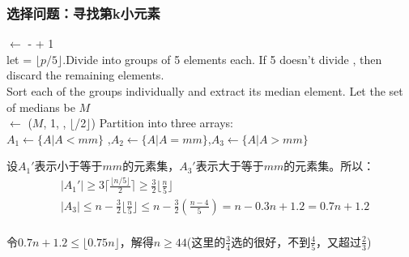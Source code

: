 \documentclass[./../main.tex]{subfiles}
\begin{document}
\subsubsection{选择问题：寻找第k小元素}
\begin{algorithm}[!t]


    \BlankLine
    \p $\leftarrow$ \high - \low + 1\\
    let \q = $\lfloor p/5 \rfloor$.Divide \A into \q groups of 5 elements each. If 5 doesn't divide \p, then discard the remaining elements.\\
    Sort each of the \q groups individually and extract its median element. Let the set of medians be $M$ \\ 
    \mm $\leftarrow$ \Select($M$, 1, \q, $\lfloor$\q/2$\rfloor$) 
    Partition \A into three arrays:\\
    $A_1\leftarrow \{A|A<mm\}$ ,$A_2\leftarrow\{A|A=mm\}$,$A_3 \leftarrow\{A|A>mm\}$\\
    
    \caption{SELECT algorithm}
\end{algorithm}

设$A_1'$表示小于等于$mm$的元素集，$A_3'$表示大于等于$mm$的元素集。所以：
\begin{align*}
    &|A_1'|\ge 3\lceil\frac{\lfloor n/5\rfloor}{2}\rceil\ge \frac{3}{2}\lfloor\frac{n}{5}\rfloor\\
    &|A_3|\le n-\frac{3}{2}\lfloor\frac{n}{5}\rfloor\le n-\frac{3}{2}(\frac{n-4}{5})=n-0.3n+1.2=0.7n+1.2\\
\end{align*}

令$0.7n+1.2\le \lfloor0.75n\rfloor$，解得$n\ge44$(这里的$\frac{3}{4}$选的很好，不到$\frac{4}{5}$，又超过$\frac{2}{3}$)
\end{document}
